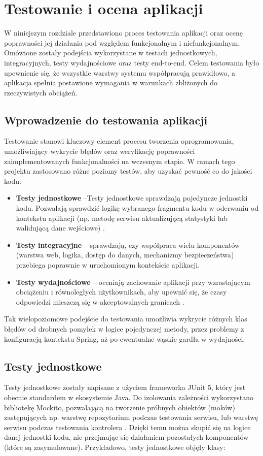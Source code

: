 \chapter{Testowanie i ocena aplikacji} W niniejszym rozdziale przedstawiono proces testowania aplikacji oraz ocenę poprawności jej działania pod względem funkcjonalnym i niefunkcjonalnym. Omówione zostały podejścia wykorzystane w testach jednostkowych, integracyjnych, testy wydajnościowe oraz testy end-to-end. Celem testowania było upewnienie się, że wszystkie warstwy systemu współpracują prawidłowo, a aplikacja spełnia postawione wymagania w warunkach zbliżonych do rzeczywistych obciążeń. \section{Wprowadzenie do testowania aplikacji} Testowanie stanowi kluczowy element procesu tworzenia oprogramowania, umożliwiający wykrycie błędów oraz weryfikację poprawności zaimplementowanych funkcjonalności na wczesnym etapie. W ramach tego projektu zastosowano różne poziomy testów, aby uzyskać pewność co do jakości kodu: \begin{itemize}
\item \textbf{Testy jednostkowe} –Testy jednostkowe sprawdzają pojedyncze jednostki kodu. Pozwalają sprawdzić logikę wybranego fragmentu kodu w oderwaniu od kontekstu aplikacji (np. metodę serwisu aktualizującą statystyki lub walidującą dane wejściowe) \cite{effective-unit-testing}.
\item \textbf{Testy integracyjne} – sprawdzają, czy współpraca wielu komponentów (warstwa web, logika, dostęp do danych, mechanizmy bezpieczeństwa) przebiega poprawnie w uruchomionym kontekście aplikacji. \cite{spring-docs}
\item \textbf{Testy wydajnościowe} – oceniają zachowanie aplikacji przy wzrastającym obciążeniu i równoległych użytkownikach, aby upewnić się, że czasy odpowiedzi mieszczą się w akceptowalnych granicach \cite{jmeter-docs}.
\end{itemize} Tak wielopoziomowe podejście do testowania umożliwia wykrycie różnych klas błędów od drobnych pomyłek w logice pojedynczej metody, przez problemy z konfiguracją kontekstu Spring, aż po ewentualne wąskie gardła w wydajności. \section{Testy jednostkowe} Testy jednostkowe zostały napisane z użyciem frameworka JUnit 5, który jest obecnie standardem w ekosystemie Java. Do izolowania zależności wykorzystano bibliotekę Mockito, pozwalającą na tworzenie próbnych obiektów (moków) zastępujących np. warstwę repozytorium podczas testowania serwisu, lub warstwę serwisu podczas testowania kontrolera \cite{mockito-docs}. Dzięki temu można skupić się na logice danej jednostki kodu, nie przejmując się działaniem pozostałych komponentów (które są zasymulowane). Przykładowo, testy jednostkowe objęły klasy:
